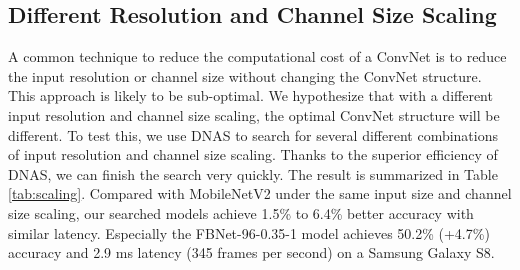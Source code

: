 \documentclass[10pt,twocolumn,letterpaper]{article}
\begin{document}
\subsection{Different Resolution and Channel Size Scaling}
A common technique to reduce the computational cost of a ConvNet is to reduce the input resolution or channel size without changing the ConvNet structure. This approach is likely to be sub-optimal. We hypothesize that with a different input resolution and channel size scaling, the optimal ConvNet structure will be different. To test this, we use DNAS to search for several different combinations of input resolution and channel size scaling. Thanks to the superior efficiency of DNAS, we can finish the search very quickly. The result is summarized in Table \ref{tab:scaling}. Compared with MobileNetV2 under the same input size and channel size scaling, our searched models achieve 1.5\% to 6.4\% better accuracy with similar latency. Especially the FBNet-96-0.35-1 model achieves 50.2\% (+4.7\%) accuracy and 2.9 ms latency (345 frames per second) on a Samsung Galaxy S8.
\end{document}
